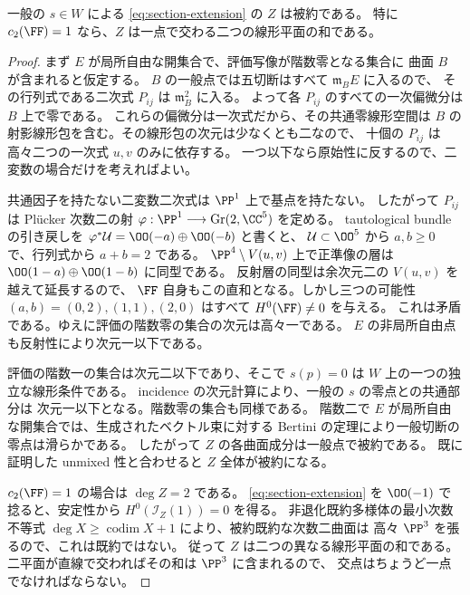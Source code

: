 \begin{lemma}[評価の階数零の集合と被約性]
\label{lem:rank-zero-and-reduced-section}
一般の $s\in W$ による \eqref{eq:section-extension} の $Z$ は被約である。
特に $c_2(\FF)=1$ なら、$Z$ は一点で交わる二つの線形平面の和である。
\end{lemma}

\begin{proof}
まず $E$ が局所自由な開集合で、評価写像が階数零となる集合に
曲面 $B$ が含まれると仮定する。
$B$ の一般点では五切断はすべて $\mathfrak m_B E$ に入るので、
その行列式である二次式 $P_{ij}$ は $\mathfrak m_B^2$ に入る。
よって各 $P_{ij}$ のすべての一次偏微分は $B$ 上で零である。
これらの偏微分は一次式だから、その共通零線形空間は
$B$ の射影線形包を含む。その線形包の次元は少なくとも二なので、
十個の $P_{ij}$ は高々二つの一次式 $u,v$ のみに依存する。
一つ以下なら原始性に反するので、二変数の場合だけを考えればよい。

共通因子を持たない二変数二次式は $\PP^1$ 上で基点を持たない。
したがって $P_{ij}$ は Pl\"ucker 次数二の射
$\varphi:\PP^1\longrightarrow\operatorname{Gr}(2,\CC^5)$ を定める。
tautological bundle の引き戻しを
$\varphi^*\mathcal U=\OO(-a)\oplus\OO(-b)$ と書くと、
$\mathcal U\subset\OO^5$ から $a,b\geq0$ で、行列式から $a+b=2$ である。
$\PP^4\setminus V(u,v)$ 上で正準像の層は
$\OO(1-a)\oplus\OO(1-b)$ に同型である。
反射層の同型は余次元二の $V(u,v)$ を越えて延長するので、
$\FF$ 自身もこの直和となる。しかし三つの可能性
$(a,b)=(0,2),(1,1),(2,0)$ はすべて $H^0(\FF)\neq0$ を与える。
これは矛盾である。ゆえに評価の階数零の集合の次元は高々一である。
$E$ の非局所自由点も反射性により次元一以下である。

評価の階数一の集合は次元二以下であり、そこで $s(p)=0$ は
$W$ 上の一つの独立な線形条件である。
incidence の次元計算により、一般の $s$ の零点との共通部分は
次元一以下となる。階数零の集合も同様である。
階数二で $E$ が局所自由な開集合では、生成されたベクトル束に対する
Bertini の定理により一般切断の零点は滑らかである。
したがって $Z$ の各曲面成分は一般点で被約である。
既に証明した unmixed 性と合わせると $Z$ 全体が被約になる。

$c_2(\FF)=1$ の場合は $\deg Z=2$ である。
\eqref{eq:section-extension} を $\OO(-1)$ で捻ると、安定性から
$H^0(\mathcal I_Z(1))=0$ を得る。
非退化既約多様体の最小次数不等式
$\deg X\geq\operatorname{codim}X+1$ により、被約既約な次数二曲面は
高々 $\PP^3$ を張るので、これは既約ではない。
従って $Z$ は二つの異なる線形平面の和である。
二平面が直線で交わればその和は $\PP^3$ に含まれるので、
交点はちょうど一点でなければならない。
\end{proof}


